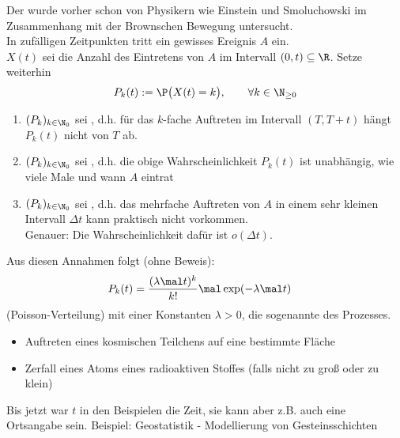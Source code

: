 \begin{beisp}\enter
	Der  wurde vorher schon von Physikern wie Einstein und Smoluchowski im Zusammenhang mit der Brownschen Bewegung untersucht.\\
	In zufälligen Zeitpunkten tritt ein gewisses Ereignis $A$ ein.\\
	$X(t)$ sei die Anzahl des Eintretens von $A$ im Intervall $(0,t)\subseteq\R$.
	Setze weiterhin
	\begin{align*}
		P_k(t):=\P\big(X(t)=k\big),\qquad\forall k\in\N_{\geq0}
	\end{align*}
	\begin{enumerate}
		\item $(P_k)_{k\in\N_0}$ sei , d.h. für das $k$-fache Auftreten im Intervall $(T,T+t)$ hängt $P_k(t)$ nicht von $T$ ab.
		\item $(P_k)_{k\in\N_0}$ sei , d.h. die obige Wahrscheinlichkeit $P_k(t)$ ist unabhängig, wie viele Male und wann $A$  eintrat
		\item $(P_k)_{k\in\N_0}$ sei , d.h. das mehrfache Auftreten von $A$ in einem sehr kleinen Intervall $\Delta t$ kann praktisch nicht vorkommen.\\
		Genauer:
		Die Wahrscheinlichkeit dafür ist $o(\Delta t)$.
	\end{enumerate}
	 Aus diesen Annahmen folgt (ohne Beweis):
	 \begin{align*}
	 	P_k(t)&=\frac{(\lambda\mal t)^k}{k!}\mal\exp(-\lambda\mal t)
	 \end{align*}
	 (Poisson-Verteilung) mit einer Konstanten $\lambda>0$, die sogenannte  des Prozesses.\nl
	 \begin{itemize}
	 	\item Auftreten eines kosmischen Teilchens auf eine  bestimmte Fläche
	 	\item Zerfall eines Atoms eines radioaktiven Stoffes
	 	(falls nicht zu groß oder zu klein)
	 \end{itemize}
\end{beisp}

Bis jetzt war $t$ in den Beispielen die Zeit, sie kann aber z.B. auch eine Ortsangabe sein.
Beispiel: Geostatistik - Modellierung von Gesteinsschichten

